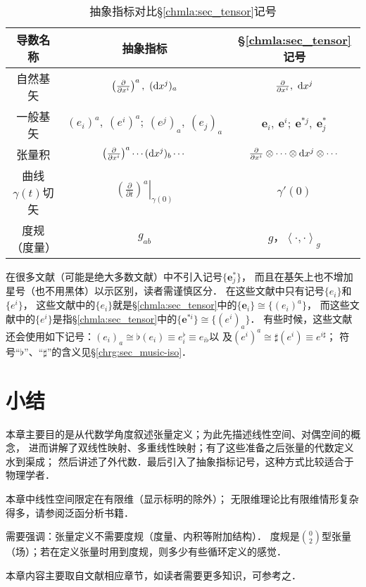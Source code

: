 \begin{table}[htb]
    \centering
    \caption{抽象指标对比\S\ref{chmla:sec_tensor}记号} \label{chmla:tab-aivscc}
    \begin{tabular}{|*3{c|}}
        \hline
        导数名称 & 抽象指标 & \S\ref{chmla:sec_tensor}记号 \\ 
        \hline
        自然基矢 & $\left(\frac{\partial}{\partial x^i} \right)^a,\  ({\rm d}x^j)_a$ 
                 & $\frac{\partial}{\partial x^i}, \  {\rm d}x^j$    \\ 
        \hline
        一般基矢 & $(e_i)^a,\ (e^i)^a;\ (e^j)_a,\ (e_j)_a$ &  $\boldsymbol{e}_i,\ \boldsymbol{e}^i;\ 
        \boldsymbol{e}^{*j},\  \boldsymbol{e}^{*}_{j} $    \\ 
        \hline
        张量积   & $\left(\frac{\partial}{\partial x^i} \right)^a \cdots ({\rm d}x^j)_b \cdots $ 
                   &  $\frac{\partial}{\partial x^i}\otimes \cdots\otimes
                   {\rm d}x^j \otimes \cdots$    \\ 
        \hline        
        曲线$\gamma(t)$切矢 & $\left.\left(\frac{\partial}{\partial t} \right)^a \right|_{\gamma(0)} $ 
          & $\gamma'(0)$  \\ 
        \hline
        度规（度量） & $g_{ab}$ & $g$，$\left<\cdot ,\cdot \right>_{g}$ \\ \hline
    \end{tabular}
\end{table}

\begin{remark}
	在很多文献（可能是绝大多数文献）中不引入记号$\{\boldsymbol{e}_j^{*}\}$，
	而且在基矢上也不增加星号（也不用黑体）以示区别，读者需谨慎区分．
	在这些文献中只有记号$\{{e}_i\}$和$\{{e}^{i}\}$，
	这些文献中的$\{{e}_i\}$就是\S\ref{chmla:sec_tensor}中的$\{\boldsymbol{e}_i\}\cong \{(e_i)^a\}$，
	而这些文献中的$\{{e}^{i}\}$是指\S\ref{chmla:sec_tensor}中的$\{\boldsymbol{e}^{*i}\}\cong \{(e^i)_a\}$．
	有些时候，这些文献还会使用如下记号：$(e_i)_a \cong \flat({e}_i) \equiv {e}_i^\flat \equiv {e}_{i\flat}$以
	及$(e^i)^a \cong \sharp({e}^{i}) \equiv {e}^{i\sharp}$；
	符号“$\flat$”、“$\sharp$”的含义见\S\ref{chrg:sec_music-iso}．
\end{remark}



\section*{小结}


本章主要目的是从代数学角度叙述张量定义；为此先描述线性空间、对偶空间的概念，
进而讲解了双线性映射、多重线性映射；有了这些准备之后张量的代数定义水到渠成；
然后讲述了外代数．最后引入了抽象指标记号，这种方式比较适合于物理学者．

本章中线性空间限定在有限维（显示标明的除外）；
无限维理论比有限维情形复杂得多，请参阅泛函分析书籍．

需要强调：张量定义不需要度规（度量、内积等附加结构）．
度规是$\binom{0}{2}$型张量（场）；若在定义张量时用到度规，则多少有些循环定义的感觉．

本章内容主要取自文献\parencite{qiuws-2019-v2}相应章节，如读者需要更多知识，可参考之．

\printbibliography[heading=subbibliography,title=第\ref{chmla}章参考文献]
\endinput


